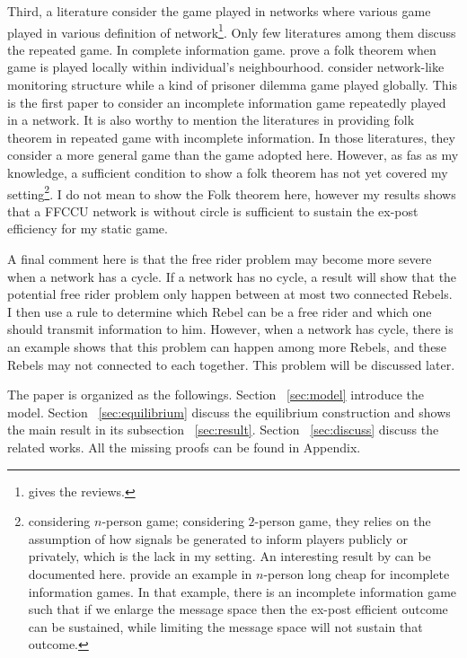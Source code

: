 \documentclass[12pt,letter]{article}
\theoremstyle{definition}
\theoremstyle{remark}
\theoremstyle{claim}
\begin{document}
Third, a literature consider the game played in networks where various game played in various definition of network\footnote{\citep{Jackson2008}\citep{Goyal2012} gives the reviews.}. Only few literatures among them discuss the repeated game. In complete information game. \citep{Laclau2012} prove a folk theorem when game is played locally within individual's neighbourhood. \citep{Wolitzky2013} \citep{Wolitzky2014}consider network-like monitoring structure while a kind of prisoner dilemma game played globally. This is the first paper to consider an incomplete information game repeatedly played in a network. It is also worthy to mention the literatures in providing folk theorem in repeated game with incomplete information. In those literatures, they consider a more general game than the game adopted here. However, as fas as my knowledge, a sufficient condition to show a folk theorem has not yet covered my setting\footnote{\citep{Fudenberg2010} \citep{Fudenberg2011} \citep{Wiseman2012} considering $n$-person game; \citep{Yamamoto2014} considering $2$-person game, they relies on the assumption of how signals be generated to inform players publicly or privately, which is the lack in my setting. An interesting result by \citep{Amitai} can be documented here. \citep{Amitai} provide an example in $n$-person long cheap for incomplete information games. In that example, there is an incomplete information game such that if we enlarge the message space then the ex-post efficient outcome can be sustained, while limiting the message space will not sustain that outcome.}. I do not mean to show the Folk theorem here, however my results shows that a FFCCU network is without circle is sufficient to sustain the ex-post efficiency for my static game. 

A final comment here is that the free rider problem may become more severe when a network has a cycle. If a network has no cycle, a result will show that the potential free rider problem only happen between at most two connected Rebels. I then use a rule to determine which Rebel can be a free rider and which one should transmit information to him. However, when a network has cycle, there is an example shows that this problem can happen among more Rebels, and these Rebels may not connected to each together. This problem will be discussed later.

The paper is organized as the followings. Section ~\ref{sec:model} introduce the model. Section ~\ref{sec:equilibrium} discuss the equilibrium construction and shows the main result in its subsection ~\ref{sec:result}. Section ~\ref{sec:discuss} discuss the related works. All the missing proofs can be found in Appendix.
\end{document}
